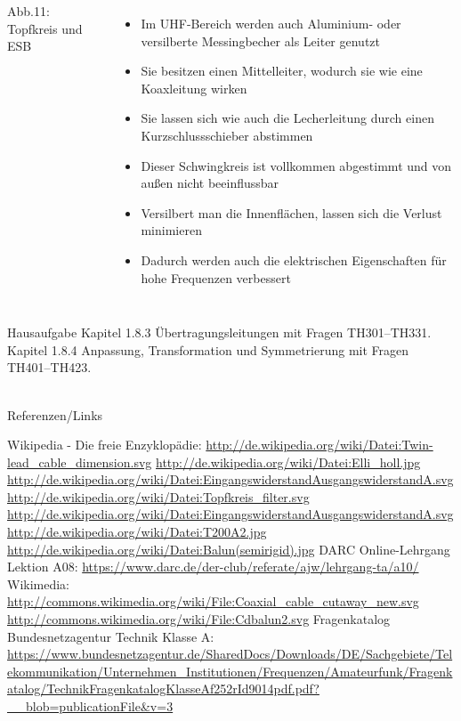 \begin{frame}
\begin{columns}
    {\tiny Abb.11: Topfkreis und ESB}
    \begin{itemize}
      \item Im UHF-Bereich werden auch Aluminium- oder versilberte Messingbecher als Leiter genutzt
      \item Sie besitzen einen Mittelleiter, wodurch sie wie eine Koaxleitung wirken
      \item Sie lassen sich wie auch die Lecherleitung durch einen Kurzschlussschieber abstimmen
      \item Dieser Schwingkreis ist vollkommen abgestimmt und von außen nicht beeinflussbar
      \item Versilbert man die Innenflächen, lassen sich die Verlust minimieren
      \item Dadurch werden auch die elektrischen Eigenschaften für hohe Frequenzen verbessert
    \end{itemize}
  \end{columns}
\end{frame}

\begin{frame}
  \begin{exampleblock}{Hausaufgabe}
    Kapitel 1.8.3 Übertragungsleitungen mit Fragen TH301--TH331.\\
    Kapitel 1.8.4 Anpassung, Transformation und Symmetrierung mit Fragen TH401--TH423.\\
  \end{exampleblock}
\end{frame}

\renewcommand{\refname}{Referenzen}

\hypertarget{refs}{}
\textcolor{white}{} \\ %
\Large Referenzen/Links
\footnotesize

\begin{thebibliography}{}
      Wikipedia - Die freie Enzyklopädie:
    \url{http://de.wikipedia.org/wiki/Datei:Twin-lead_cable_dimension.svg}
    \url{http://de.wikipedia.org/wiki/Datei:Elli_holl.jpg}
    \url{http://de.wikipedia.org/wiki/Datei:EingangswiderstandAusgangswiderstandA.svg}
    \url{http://de.wikipedia.org/wiki/Datei:Topfkreis_filter.svg}
    \url{http://de.wikipedia.org/wiki/Datei:EingangswiderstandAusgangswiderstandA.svg}
    \url{http://de.wikipedia.org/wiki/Datei:T200A2.jpg}
    \url{http://de.wikipedia.org/wiki/Datei:Balun(semirigid).jpg}
    DARC Online-Lehrgang Lektion A08:
    \url{https://www.darc.de/der-club/referate/ajw/lehrgang-ta/a10/}
   	Wikimedia:
    \url{http://commons.wikimedia.org/wiki/File:Coaxial_cable_cutaway_new.svg}
    \url{http://commons.wikimedia.org/wiki/File:Cdbalun2.svg}
     Fragenkatalog Bundesnetzagentur Technik Klasse A:
    \mbox{\url{https://www.bundesnetzagentur.de/SharedDocs/Downloads/DE/Sachgebiete/Telekommunikation/Unternehmen_Institutionen/Frequenzen/Amateurfunk/Fragenkatalog/TechnikFragenkatalogKlasseAf252rId9014pdf.pdf?__blob=publicationFile&v=3}}
\end{thebibliography}


